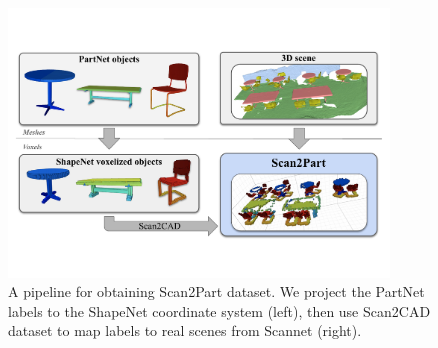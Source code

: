\begin{figure}[!t]
\label{fig:dataset_schema}
\centering
\includegraphics[width=0.9\textwidth]{Figures/scan2part/dataset_schema.pdf}
\caption{A pipeline for obtaining Scan2Part dataset. We project the PartNet \cite{mo2019partnet} labels to the ShapeNet \cite{chang2015shapenet} coordinate system (left), then use Scan2CAD \cite{avetisyan2019scan2cad} dataset to map labels to real scenes from Scannet \cite{dai2017scannet} (right).}
\end{figure}




